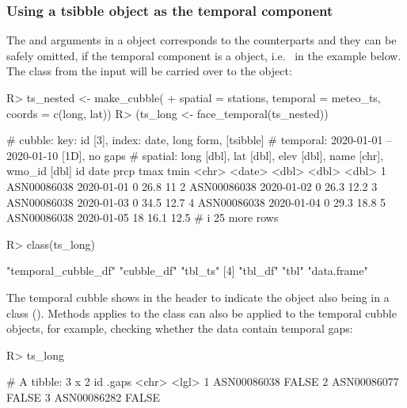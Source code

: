 \documentclass[
  shortnames]{jss}
\begin{document}
\hypertarget{using-a-tsibble-object-as-the-temporal-component}{%
\subsubsection{Using a tsibble object as the temporal component}\label{using-a-tsibble-object-as-the-temporal-component}}

The  and  arguments in a  object corresponds to the  counterparts and they can be safely omitted, if the temporal component is a  object, i.e.~ in the example below. The  class from the input will be carried over to the  object:

\begin{CodeChunk}
\begin{CodeInput}
R> ts_nested <- make_cubble(
+   spatial = stations, temporal = meteo_ts, coords = c(long, lat))
R> (ts_long <- face_temporal(ts_nested))
\end{CodeInput}
\begin{CodeOutput}
# cubble:   key: id [3], index: date, long form, [tsibble]
# temporal: 2020-01-01 -- 2020-01-10 [1D], no gaps
# spatial:  long [dbl], lat [dbl], elev [dbl], name [chr], wmo_id [dbl]
  id          date        prcp  tmax  tmin
  <chr>       <date>     <dbl> <dbl> <dbl>
1 ASN00086038 2020-01-01     0  26.8  11  
2 ASN00086038 2020-01-02     0  26.3  12.2
3 ASN00086038 2020-01-03     0  34.5  12.7
4 ASN00086038 2020-01-04     0  29.3  18.8
5 ASN00086038 2020-01-05    18  16.1  12.5
# i 25 more rows
\end{CodeOutput}
\begin{CodeInput}
R> class(ts_long)
\end{CodeInput}
\begin{CodeOutput}
[1] "temporal_cubble_df" "cubble_df"          "tbl_ts"            
[4] "tbl_df"             "tbl"                "data.frame"        
\end{CodeOutput}
\end{CodeChunk}

The temporal cubble shows \code{[tsibble]} in the header to indicate the object also being in a  class (). Methods applies to the  class can also be applied to the temporal cubble objects, for example, checking whether the data contain temporal gaps:

\begin{CodeChunk}
\begin{CodeInput}
R> ts_long %
\end{CodeInput}
\begin{CodeOutput}
# A tibble: 3 x 2
  id          .gaps
  <chr>       <lgl>
1 ASN00086038 FALSE
2 ASN00086077 FALSE
3 ASN00086282 FALSE
\end{CodeOutput}
\end{CodeChunk}
\end{document}
